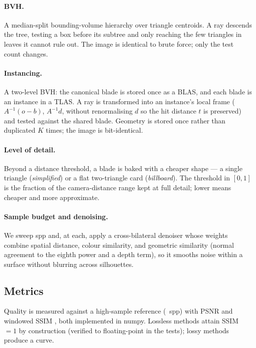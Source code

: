 \paragraph{BVH.} A median-split bounding-volume hierarchy over triangle
centroids. A ray descends the tree, testing a box before its subtree and only
reaching the few triangles in leaves it cannot rule out. The image is identical
to brute force; only the test count changes.

\paragraph{Instancing.} A two-level BVH: the canonical blade is stored once as a
BLAS, and each blade is an instance in a TLAS. A ray is transformed into an
instance's local frame ($A^{-1}(o-b)$, $A^{-1}d$, without renormalising $d$ so
the hit distance $t$ is preserved) and tested against the shared blade. Geometry
is stored once rather than duplicated $K$ times; the image is bit-identical.

\paragraph{Level of detail.} Beyond a distance threshold, a blade is baked with a
cheaper shape --- a single triangle (\emph{simplified}) or a flat two-triangle
card (\emph{billboard}). The threshold in $[0,1]$ is the fraction of the
camera-distance range kept at full detail; lower means cheaper and more
approximate.

\paragraph{Sample budget and denoising.} We sweep spp and, at each, apply a
cross-bilateral denoiser whose weights combine spatial distance, colour
similarity, and geometric similarity (normal agreement to the eighth power and a
depth term), so it smooths noise within a surface without blurring across
silhouettes.

\subsection{Metrics}
Quality is measured against a high-sample reference (\RefSpp\ spp) with PSNR and
windowed SSIM \cite{wang2004image}, both implemented in numpy. Lossless methods
attain SSIM $=1$ by construction (verified to floating-point in the tests);
lossy methods produce a curve.
